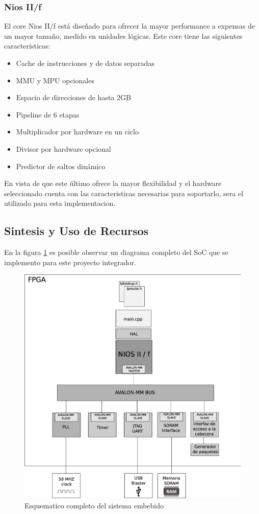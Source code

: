 \subsubsection{Nios II/f}
El core Nios II/f está diseñado para ofrecer la mayor performance a expensas de un mayor tamaño, medido en unidades lógicas. Este core tiene las siguientes características:

\begin{itemize}
	\item Cache de instrucciones y de datos separadas
	\item MMU y MPU opcionales
	\item Espacio de direcciones de hasta 2GB
	\item Pipeline de 6 etapas
	\item Multiplicador por hardware en un ciclo
	\item Divisor por hardware opcional
	\item Predictor de saltos dinámico
\end{itemize}

En vista de que este último ofrece la mayor flexibilidad y el hardware seleccionado cuenta con las caracteristicas necesarias para soportarlo, sera el utilizado para esta implementacion. 




\subsection{Sintesis y Uso de Recursos}

En la figura \ref{fig:comple} es posible observar un diagrama completo del SoC que se implemento para este proyecto integrador.

\begin{figure}[H]
  \centering
	\includegraphics[scale=0.40]{4-implementacion/graf/sistema.eps}
  \caption{Esquematico completo del sistema embebido}
  \label{fig:comple}
\end{figure}

